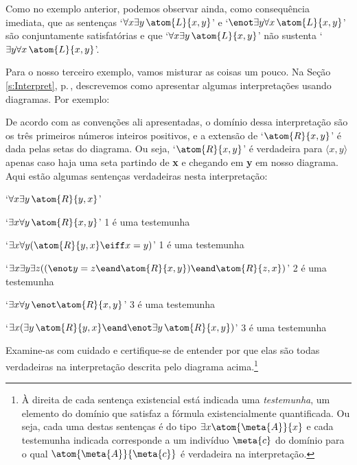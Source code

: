 Como no exemplo anterior, podemos observar ainda, como consequência imediata, que as sentenças `$\forall x \exists y\, \atom{L}{x,y}$' e `$\enot\exists y \forall x\, \atom{L}{x,y}$' são conjuntamente satisfatórias e que `$\forall x \exists y\, \atom{L}{x,y}$' não sustenta `$\exists y \forall x\, \atom{L}{x,y}$'.

Para o nosso terceiro exemplo, vamos misturar as coisas um pouco.
Na Seção \ref{s:Interpret}, p.\,\pageref{s:Interpret}, descrevemos como apresentar algumas interpretações usando diagramas. Por exemplo:
\begin{center}
\end{center}
De acordo com as convenções ali apresentadas, o domínio dessa interpretação são os três primeiros números inteiros positivos, e a extensão de  `$\atom{R}{x,y}$' é dada pelas setas do diagrama.
Ou seja, `$\atom{R}{x,y}$' é verdadeira para $\langle x, y \rangle$ apenas caso haja uma seta partindo  de \textbf{x} e chegando em \textbf{y} em nosso diagrama.
Aqui estão algumas sentenças verdadeiras nesta interpretação:
	\begin{ebullet}
		\item `$\forall x \exists y\, \atom{R}{y,x}$' 
		\item `$\exists x \forall y\, \atom{R}{x,y}$' \hfill  {\footnotesize 1 é uma testemunha}
		\item `$\exists x \forall y (\atom{R}{y,x} \eiff x = y)$' \hfill {\footnotesize 1 é uma testemunha}
		\item `$\exists x \exists y \exists z ((\enot y = z \eand \atom{R}{x,y}) \eand \atom{R}{z,x})$' \hfill {\footnotesize 2 é uma testemunha}
		\item `$\exists x \forall y\, \enot \atom{R}{x,y}$' \hfill {\footnotesize 3 é uma testemunha}
		\item `$\exists x (\exists y\, \atom{R}{y,x} \eand \enot \exists y\, \atom{R}{x,y})$' \hfill {\footnotesize 3 é uma testemunha}
	\end{ebullet}
Examine-as com cuidado e certifique-se de entender por que elas são todas verdadeiras na interpretação descrita pelo diagrama acima.\footnote{
	À direita de cada sentença existencial está indicada uma \textit{testemunha}, um elemento do domínio que satisfaz a fórmula existencialmente quantificada.
	Ou seja, cada uma destas sentenças é do tipo $\exists x \atom{\meta{A}}{x}$ e cada testemunha indicada corresponde a um indivíduo $\meta{c}$ do domínio para o qual $\atom{\meta{A}}{\meta{c}}$ é verdadeira na interpretação.}	
	
